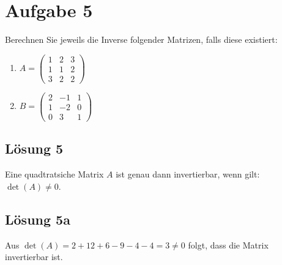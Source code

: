 \documentclass[main.tex]{subfiles}
\begin{document}
\section{Aufgabe 5}
Berechnen Sie jeweils die Inverse folgender Matrizen, falls diese existiert:

\begin{enumerate}
    \item $A = \begin{pmatrix}
        1 & 2 & 3 \\
        1 & 1 & 2 \\
        3 & 2 & 2
    \end{pmatrix}$ \\
    \item $B = \begin{pmatrix}
        2 & -1 & 1 \\
        1 & -2 & 0 \\
        0 &  3 & 1 
    \end{pmatrix}$
\end{enumerate}

\subsection{Lösung 5}

Eine quadtratsiche Matrix $A$ ist genau dann invertierbar, wenn gilt: $\det (A) \neq 0$.


\subsection{Lösung 5a}
Aus $\det (A) = 2 + 12 + 6 -9 -4 -4 = 3 \neq 0$ folgt, dass die Matrix invertierbar ist. 
\end{document}
